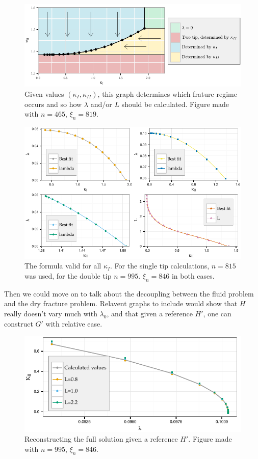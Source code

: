 \documentclass{jfm}
\begin{document}
\begin{figure}
 \centerline{
\includegraphics{./../../Graphs/catagory-edited.pdf}}
  \caption{Given values $(\kappa_I,\kappa_{II})$, this graph determines which
           frature regime occurs and so how $\lambda$ and/or $L$ should be 
           calculated. Figure made with $n=465$, $\xi_n = 819$.}
\end{figure}

\begin{figure}
 \centerline{
\includegraphics{./../../Graphs/overall-fit.pdf}}
  \caption{The formula valid for all $\kappa_I$. For the single tip 
           calculations, $n=815$ was used, for the double tip $n=995$. 
           $\xi_n = 846$ in both cases.  }
\end{figure}

Then we could move on to talk about the decoupling between the fluid problem
and the dry fracture problem. Relavent graphs to include would show that
$H$ really doesn't vary much with $\lambda_0$, and that given a reference
$H'$, one can construct $G'$ with relative ease.

\begin{figure}
 \centerline{
\includegraphics{./../../Graphs/fixed-fluid.pdf}}
  \caption{Reconstructing the full solution given a reference $H'$. Figure 
           made with $n=995$, $\xi_n = 846$.}
\end{figure}
\end{document}
